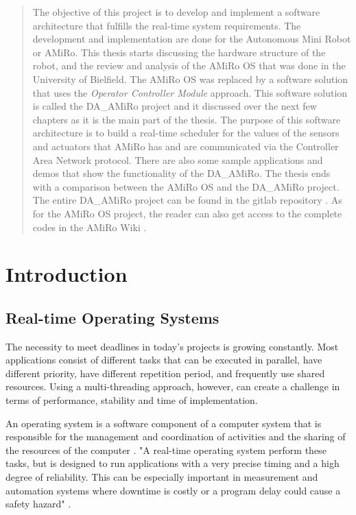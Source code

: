 \documentclass[12pt]{report}%
\begin{document}
\begin{abstract}
The objective of this project is to develop and implement a software architecture that fulfills the real-time system requirements. The development and implementation are done for the Autonomous Mini Robot or AMiRo. This thesis starts discussing the hardware structure of the robot, and the review and analysis of the AMiRo OS that was done in the University of Bielfield. The AMiRo OS was replaced by a software solution that uses the \textit{Operator Controller Module} approach. This software solution is called the DA\_AMiRo project and it discussed over the next few chapters as it is the main part of the thesis. The purpose of this software architecture is to build a real-time scheduler for the values of the sensors and actuators that AMiRo has and are communicated via the Controller Area Network protocol. There are also some sample applications and demos that show the functionality of the DA\_AMiRo. The thesis ends with a comparison between the AMiRo OS and the DA\_AMiRo project. The entire DA\_AMiRo project can be found in the gitlab repository \cite{AMiRo_Git}. As for the AMiRo OS project, the reader can also get access to the complete codes in the AMiRo Wiki \cite{AMiRo_Wiki}.

\end{abstract}

\chapter{Introduction}
\section{Real-time Operating Systems}
The necessity to meet deadlines in today's projects is growing constantly. Most applications consist of different tasks that can be executed in parallel, have different priority, have different repetition period, and frequently use shared resources. Using a multi-threading approach, however, can create a challenge in terms of performance, stability and time of implementation.

An operating system is a software component of a computer system that is responsible for the management and coordination of activities and the sharing of the resources of the computer \cite{mcgraw}. "A real-time operating system perform these tasks, but is designed to run applications with a very precise timing and a high degree of reliability. This can be especially important in measurement and automation systems where downtime is costly or a program delay could cause a safety hazard" \cite{rtos}.
\end{document}
